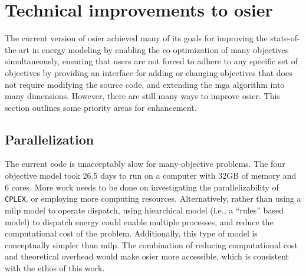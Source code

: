 



\section{Technical improvements to \ac{osier}}

The current version of \ac{osier} achieved many of its goals for improving the
state-of-the-art in energy modeling by enabling the co-optimization of many
objectives simultaneously, ensuring that users are not forced to adhere to any
specific set of objectives by providing an interface for adding or changing
objectives that does not require modifying the source code, and extending the
\ac{mga} algorithm into many dimensions. However, there are still many ways to
improve \ac{osier}. This section outlines some priority areas for enhancement.


\subsection{Parallelization}

The current code is unacceptably slow for many-objective problems. The four
objective model took 26.5 days to run on a computer with 32GB of memory and 6
cores. More work needs to be done on investigating the parallelizability of
\texttt{CPLEX}, or employing more computing resources. Alternatively, rather
than using a \ac{milp} model to operate dispatch, using hiearchical model (i.e.,
a ``rules'' based model) to dispatch energy could enable multiple processes, and
reduce the computational cost of the problem. Additionally, this type of model
is conceptually simpler than \ac{milp}. The combination of reducing
computational cost and theoretical overhead would make \ac{osier} more
accessible, which is consistent with the ethos of this work.


